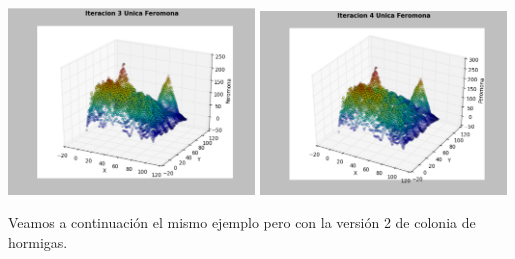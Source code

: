 \begin{center}
\includegraphics[width=0.49\textwidth]{imagenes/iter3}
\includegraphics[width=0.49\textwidth]{imagenes/iter4}
\end{center}

\newpage

Veamos a continuaci\'on el mismo ejemplo pero con la versi\'on 2 de colonia de hormigas.

